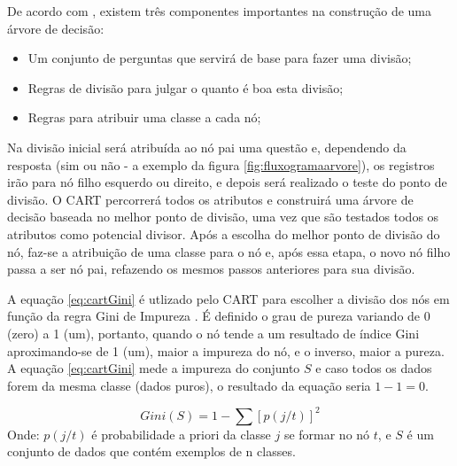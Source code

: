 De acordo com \cite{yohannes1999classification,Raimundo2008}, existem três componentes importantes na construção de uma árvore de decisão:

\begin{itemize}
[noitemsep]
 \item Um conjunto de perguntas que servirá de base para fazer uma divisão;
 \item Regras de divisão para julgar o quanto é boa esta divisão;
 \item Regras para atribuir uma classe a cada nó;
\end{itemize}

Na divisão inicial será atribuída ao nó pai uma questão e,  dependendo da resposta (sim ou não - a exemplo da figura \ref{fig:fluxogramaarvore}), os registros irão para nó filho esquerdo ou direito, e depois será realizado o teste do ponto de divisão. O CART percorrerá todos os atributos e construirá uma árvore de decisão baseada no melhor ponto de divisão, uma vez que são testados todos os atributos como potencial divisor. Após a escolha do melhor ponto de divisão do nó, faz-se a atribuição de uma classe para o nó e, após essa etapa, o novo nó filho passa a ser nó pai, refazendo os mesmos passos anteriores para sua divisão.

A equação \ref{eq:cartGini} é utlizado pelo CART para escolher a divisão dos nós em função da regra Gini de Impureza \cite{breiman1984}. É definido o grau de pureza variando de 0 (zero) a 1 (um), portanto, quando o nó tende a um resultado de índice Gini aproximando-se de 1 (um), maior a impureza do nó, e o inverso, maior a pureza. A equação \ref{eq:cartGini} mede a impureza do conjunto ${S}$ e caso todos os dados forem da mesma classe (dados puros), o resultado da equação seria ${1-1=0}$.

\begin{equation}
Gini(S)= 1 - \sum [p(j/t)]^2
 \label{eq:cartGini}
\end{equation}
Onde: ${p(j/t)}$ é probabilidade a priori da classe ${j}$ se formar no nó ${t}$, e ${S}$ é um conjunto de dados que contém exemplos de n classes.
 


